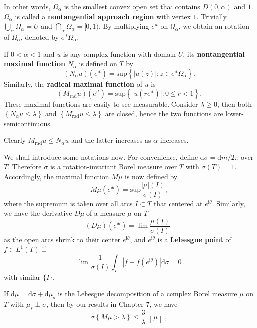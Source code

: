 In other words, $\Omega_\alpha$ is the smallest convex open set that contains $D(0,\alpha)$ and $1$. $\Omega_\alpha$ is called a \textbf{nontangential approach region} with vertex $1$. Trivially $\bigcup_{\alpha}\Omega_\alpha=U$ and $\bigcap_{\alpha}\Omega_\alpha=[0,1)$. By multiplying $e^{\mathrm{i}t}$ on $\Omega_\alpha$, we obtain an rotation of $\Omega_\alpha$, denoted by $e^{\mathrm{i}t}\Omega_\alpha$.\par
If $0<\alpha<1$ and $u$ is any complex function with domain $U$, its \textbf{nontangential maximal function} $N_\alpha$ is defined on $T$ by 
$$
\left( N_{\alpha}u \right) \left( e^{\mathrm{i}t} \right) =\mathrm{sup}\left\{ \left| u\left( z \right) \right|:z\in e^{\mathrm{i}t}\Omega _{\alpha} \right\} .
$$
Similarly, the \textbf{radical maximal function} of $u$ is 
$$
\left( M_{\mathrm{rad}}u \right) \left( e^{\mathrm{i}t} \right) =\mathrm{sup}\left\{ \left| u\left( re^{\mathrm{i}t} \right) \right|:0\le r<1 \right\} .
$$
These maximal functions are easily to see measurable. Consider $\lambda\ge 0$, then both $\left\{ N_{\alpha}u\le \lambda \right\} $ and $\left\{ M_{\mathrm{rad}}u\le \lambda \right\} $ are closed, hence the two functions are lower-semicontinuous.\par
Clearly $M_{\mathrm{rad}}u\le N_\alpha u$ and the latter increases as $\alpha$ increases.\par
We shall introduce some notations now. For convenience, define $\mathrm{d}\sigma=\mathrm{d}m/2\pi$ over $T$. Therefore $\sigma$ is a rotation-invariant Borel measure over $T$ with $\sigma(T)=1$. Accordingly, the maximal function $M\mu$ is now defined by 
$$
M\mu (e^{\mathrm{i}\theta})=\mathrm{sup}\frac{\left| \mu \right|\left( I \right)}{\sigma \left( I \right)},
$$
where the supremum is taken over all arcs $I\subset T$ that centered at $e^{\mathrm{i}\theta}$. Similarly, we have the derivative $D\mu$ of a measure $\mu$ on $T$ 
$$
\left( D\mu \right) \left( e^{\mathrm{i}\theta} \right) =\lim \frac{\mu \left( I \right)}{\sigma \left( I \right)},
$$
as the open arcs shrink to their center $e^{\mathrm{i}\theta}$, and $e^{\mathrm{i}\theta}$ is a \textbf{Lebesgue point} of $f\in L^1(T)$ if 
$$
\lim \frac{1}{\sigma \left( I \right)}\int_I{\left| f-f\left( e^{\mathrm{i}\theta} \right) \right|\mathrm{d}\sigma}=0
$$
with similar $\{I\}$.\par
If $\mathrm{d}\mu=\mathrm{d}\sigma+\mathrm{d}\mu_s$ is the Lebesgue decomposition of a complex Borel measure $\mu$ on $T$ with $\mu_s\perp\sigma$, then by our results in Chapter 7, we have 
$$
\sigma \left\{ M\mu >\lambda \right\} \le \frac{3}{\lambda}\left\| \mu \right\| ,
$$
